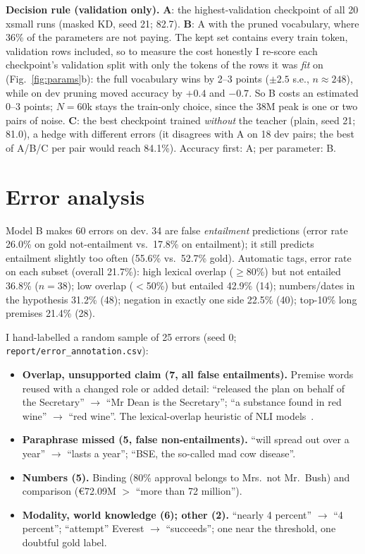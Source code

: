 \documentclass[11pt]{article}
\begin{document}
\textbf{Decision rule (validation only).} \textbf{A}: the highest-validation checkpoint of all 20 xsmall runs (masked KD, seed 21; 82.7). \textbf{B}: A with the pruned vocabulary, where 36\% of the parameters are not paying. The kept set contains every train token, validation rows included, so to measure the cost honestly I re-score each checkpoint's validation split with only the tokens of the rows it was \emph{fit} on (Fig.~\ref{fig:params}b): the full vocabulary wins by 2--3 points ($\pm2.5$ s.e., $n{\approx}248$), while on dev pruning moved accuracy by $+0.4$ and $-0.7$. So B costs an estimated 0--3 points; $N{=}60$k stays the train-only choice, since the 38M peak is one or two pairs of noise. \textbf{C}: the best checkpoint trained \emph{without} the teacher (plain, seed 21; 81.0), a hedge with different errors (it disagrees with A on 18 dev pairs; the best of A/B/C per pair would reach 84.1\%). Accuracy first: A; per parameter: B.

\section{Error analysis}
Model B makes 60 errors on dev. 34 are false \emph{entailment} predictions (error rate 26.0\% on gold not-entailment vs.\ 17.8\% on entailment); it still predicts entailment slightly too often (55.6\% vs.\ 52.7\% gold). Automatic tags, error rate on each subset (overall 21.7\%): high lexical overlap ($\geq$80\%) but not entailed 36.8\% ($n{=}38$); low overlap ($<$50\%) but entailed 42.9\% (14); numbers/dates in the hypothesis 31.2\% (48); negation in exactly one side 22.5\% (40); top-10\% long premises 21.4\% (28).

I hand-labelled a random sample of 25 errors (seed 0; \texttt{report/error\_annotation.csv}):
\begin{itemize}
\item \textbf{Overlap, unsupported claim (7, all false entailments).} Premise words reused with a changed role or added detail: ``released the plan on behalf of the Secretary'' $\to$ ``Mr Dean is the Secretary''; ``a substance found in red wine'' $\to$ ``red wine''. The lexical-overlap heuristic of NLI models~\cite{mccoy2019right}.
\item \textbf{Paraphrase missed (5, false non-entailments).} ``will spread out over a year'' $\to$ ``lasts a year''; ``BSE, the so-called mad cow disease''.
\item \textbf{Numbers (5).} Binding (80\% approval belongs to Mrs.\ not Mr.\ Bush) and comparison (\euro72.09M $>$ ``more than 72 million'').
\item \textbf{Modality, world knowledge (6); other (2).} ``nearly 4 percent'' $\to$ ``4 percent''; ``attempt'' Everest $\to$ ``succeeds''; one near the threshold, one doubtful gold label.
\end{itemize}
\end{document}
